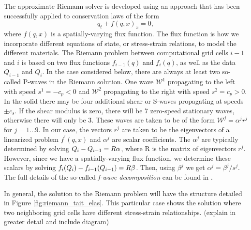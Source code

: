 \documentclass{article}
\begin{document}
The approximate Riemann solver is developed using an approach that has been successfully applied to 
conservation laws of the form
\begin{equation}
q_t + f(q,x)_x =0,
\end{equation}
where $f(q,x)$ is a spatially-varying flux function.  The flux function is how we incorporate different 
equations of state, or stress-strain relations, to model the different materials.  The Riemann problem 
between computational grid cells $i-1$ and $i$ is based on two flux functions $f_{i-1}(q)$ and $f_i(q)$, 
as well as the data $Q_{i-1}$ and $Q_i$.  In the case considered below, there are always at least two so-
called P-waves in the Riemann solution.  One wave $\mathcal{W}^1$ propagating to the left with speed 
$s^1=-c_p < 0$ and $\mathcal{W}^2$ propagating to the right with speed $s^2 = c_p > 0$.  In the solid 
there may be four additional shear or S-waves propagating at speeds $\pm c_s$.  If the shear modulus 
is zero, there will be 7 zero-speed stationary waves, otherwise there will only be 3.  These waves are 
taken to be of the form $\mathcal{W}^j = \alpha^j r^j$ for $j=1\dots9$.  In our case, the vectors $r^j$ are 
taken to be the eigenvectors of a linearized problem $f^{\prime}(q,x)$ and $\alpha^j$ are scalar 
coefficients.  The $\alpha^j$ are typically determined by solving $Q_i - Q_{i-1} = R {\bf \alpha}$, where R 
is the matrix of eigenvectors $r^j$. However, since we have a spatially-varying flux function, we 
determine these scalars by solving $f_i(Q_i) - f_{i-1}(Q_{i-1}) = R {\bf \beta}$.  Then, using $\beta^j$ we 
get $\alpha^j = \beta^j/s^j$.  The full details of the so-called {\it f-wave decomposition} can be found in 
\cite{rjl_bale_rossmanith}.

In general, the solution to the Riemann problem will have the structure detailed in Figure 
\ref{fig:riemann_tait_elas}.  This particular case shows the solution where two neighboring grid cells 
have different stress-strain relationships. 
(explain in greater detail and include diagram)
\end{document}
